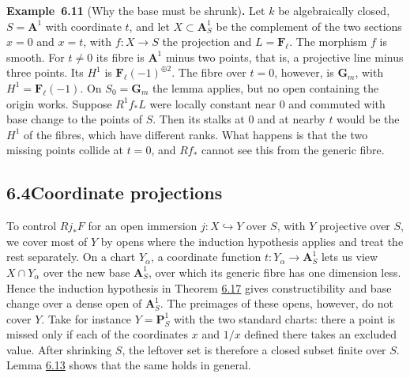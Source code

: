 \documentclass[11pt]{article}
\newenvironment{bpstatement}[2]{\par\addvspace{0.6\baselineskip}\noindent\textbf{#1}#2\textbf{.}\enspace\ignorespaces}
  {\par\addvspace{0.4\baselineskip}}
\providecommand{\Fell}{}\renewcommand{\Fell}{\mathbf F_\ell}
\begin{document}
\label{bp547}%
\begin{bpstatement}{Example~6.11}{ (Why the base must be shrunk)}
Let \(k\) be algebraically closed, \(S=\mathbf A^1\) with coordinate \(t\), and let \(X\subset\mathbf A^1_S\) be the complement of the two sections \(x=0\) and \(x=t\), with \(f:X\to S\) the projection and \(L=\Fell\). The morphism \(f\) is smooth. For \(t\neq0\) its fibre is \(\mathbf A^1\) minus two points, that is, a projective line minus three points. Its \(H^1\) is \(\Fell(-1)^{\oplus2}\). The fibre over \(t=0\), however, is \(\mathbf G_m\), with \(H^1=\Fell(-1)\). On \(S_0=\mathbf G_m\) the lemma applies, but no open containing the origin works. Suppose \(R^1f_*L\) were locally constant near \(0\) and commuted with base change to the points of \(S\). Then its stalks at \(0\) and at nearby \(t\) would be the \(H^1\) of the fibres, which have different ranks. What happens is that the two missing points collide at \(t=0\), and \(Rf_*\) cannot see this from the generic fibre.
\end{bpstatement}


\subsection*{\texorpdfstring{6.4\quad Coordinate projections}{6.4 Coordinate projections}}
\label{bp548}%
\label{bp549}%
To control \(Rj_*F\) for an open immersion \(j:X\hookrightarrow Y\) over \(S\), with \(Y\) projective over \(S\), we cover most of \(Y\) by opens where the induction hypothesis applies and treat the rest separately. On a chart \(Y_\alpha\), a coordinate function \(t:Y_\alpha\to\mathbf A^1_S\) lets us view \(X\cap Y_\alpha\) over the new base \(\mathbf A^1_S\), over which its generic fibre has one dimension less. Hence the induction hypothesis in Theorem \hyperref[bp563]{6.17} gives constructibility and base change over a dense open of \(\mathbf A^1_S\). The preimages of these opens, however, do not cover \(Y\). Take for instance \(Y=\mathbf P^1_S\) with the two standard charts: there a point is missed only if each of the coordinates \(x\) and \(1/x\) defined there takes an excluded value. After shrinking \(S\), the leftover set is therefore a closed subset finite over \(S\). Lemma \hyperref[bp553]{6.13} shows that the same holds in general.
\end{document}
